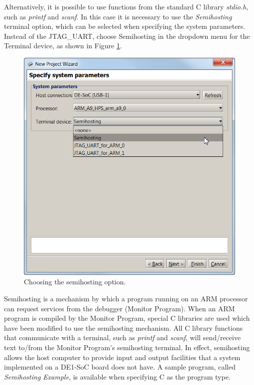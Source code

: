 \documentclass[11pt, twoside, pdftex]{article}
\begin{document}
Alternatively, it is possible to
use functions from the standard C library {\it stdio.h}, such as
{\it printf} and {\it scanf}. In this case it is necessary to
use the {\it Semihosting} terminal option, which can be selected 
when specifying the system parameters. Instead of the JTAG\_UART,
choose {\sf Semihosting} in the dropdown menu for the
{\sf Terminal device}, as shown in Figure \ref{fig:NPW_semihosting_arm}.

\begin{figure}[H]
   \begin{center}
      \includegraphics[scale=1]{screenshots/figure49.png}
   \end{center}
   \caption{Choosing the semihosting option.} 
   \label{fig:NPW_semihosting_arm}
\end{figure}

\newpage
Semihosting is a mechanism by which a
program running on an ARM processor can request services from
the debugger (Monitor Program). When an ARM program is compiled
by the Monitor Program, special C libraries are used which have
been modified to use the semihosting mechanism.
All C library functions that communicate with a terminal, such as 
{\it printf} and {\it scanf}, will send/receive text to/from
the Monitor Program's semihosting terminal. In effect,
semihosting allows the host computer to provide input and
output facilities that a system implemented on a DE1-SoC board
does not have.
A sample program, called {\it Semihosting Example}, is available
when specifying C as the program type.
\end{document}
